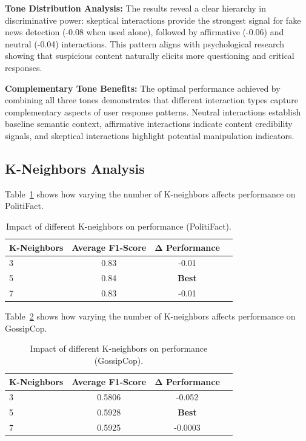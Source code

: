 \textbf{Tone Distribution Analysis:} The results reveal a clear hierarchy in discriminative power: skeptical interactions provide the strongest signal for fake news detection (-0.08 when used alone), followed by affirmative (-0.06) and neutral (-0.04) interactions. This pattern aligns with psychological research showing that suspicious content naturally elicits more questioning and critical responses.

\textbf{Complementary Tone Benefits:} The optimal performance achieved by combining all three tones demonstrates that different interaction types capture complementary aspects of user response patterns. Neutral interactions establish baseline semantic context, affirmative interactions indicate content credibility signals, and skeptical interactions highlight potential manipulation indicators.


\subsection{K-Neighbors Analysis}

Table~\ref{tab:hyperparameter_k_neighbors_politifact} shows how varying the number of K-neighbors affects performance on PolitiFact.

\begin{table}[htbp]
\centering
\caption{Impact of different K-neighbors on performance (PolitiFact).}
\label{tab:hyperparameter_k_neighbors_politifact}
\begin{tabular}{lccc}
\toprule
\textbf{K-Neighbors} & \textbf{Average F1-Score} & \textbf{Δ Performance} \\
\midrule
3 & 0.83 & -0.01 \\
5 & 0.84 & \textbf{Best} \\
7 & 0.83 & -0.01 \\
\bottomrule
\end{tabular}
\end{table}


Table~\ref{tab:hyperparameter_k_neighbors_gossipcop} shows how varying the number of K-neighbors affects performance on GossipCop.

\begin{table}[htbp]
\centering
\caption{Impact of different K-neighbors on performance (GossipCop).}
\label{tab:hyperparameter_k_neighbors_gossipcop}
\begin{tabular}{lccc}
\toprule
\textbf{K-Neighbors} & \textbf{Average F1-Score} & \textbf{Δ Performance} \\
\midrule
3 & 0.5806 & -0.052 \\
5 & 0.5928 & \textbf{Best} \\
7 & 0.5925 & -0.0003 \\
\bottomrule
\end{tabular}
\end{table}


